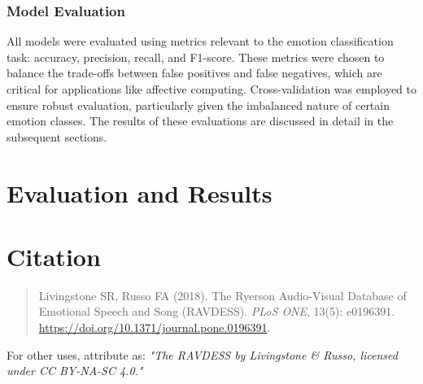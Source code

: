 \documentclass{article}
\begin{document}
\subsubsection*{Model Evaluation}

All models were evaluated using metrics relevant to the emotion classification task: accuracy, precision, recall, and 
F1-score. These metrics were chosen to balance the trade-offs between false positives and false negatives, which are critical 
for applications like affective computing. Cross-validation was employed to ensure robust evaluation, particularly given the 
imbalanced nature of certain emotion classes. The results of these evaluations are discussed in detail in the subsequent sections.








\section*{Evaluation and Results}

\section*{Citation}

\begin{quote}
Livingstone SR, Russo FA (2018). The Ryerson Audio-Visual Database of Emotional Speech and Song (RAVDESS). 
\textit{PLoS ONE}, 13(5): e0196391. \url{https://doi.org/10.1371/journal.pone.0196391}.
\end{quote}

For other uses, attribute as:  
\textit{"The RAVDESS by Livingstone \& Russo, licensed under CC BY-NA-SC 4.0."}
\end{document}
